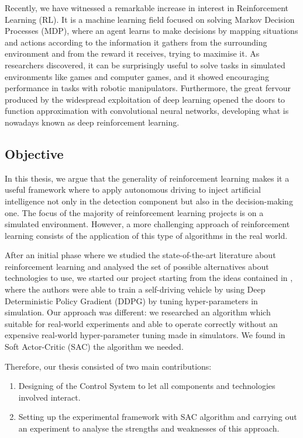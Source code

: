 \documentclass[10pt,twocolumn,letterpaper]{article}
\begin{document}
Recently, we have witnessed a remarkable increase in interest in Reinforcement Learning (RL). It is a machine learning field focused on solving Markov Decision Processes (MDP), where an agent learns to make decisions by mapping situations and actions according to the information it gathers from the surrounding environment and from the reward it receives, trying to maximise it.
As researchers discovered, it can be surprisingly useful to solve tasks in simulated environments like games and computer games, and it showed encouraging performance in tasks with robotic manipulators. Furthermore, the great fervour produced by the widespread exploitation of deep learning opened the doors to function approximation with convolutional neural networks, developing what is nowadays known as deep reinforcement learning.

\subsection{Objective}

In this thesis, we argue that the generality of reinforcement learning makes it a useful framework where to apply autonomous driving to inject artificial intelligence not only in the detection component but also in the decision-making one.
The focus of the majority of reinforcement learning projects is on a simulated environment. However, a more challenging approach of reinforcement learning consists of the application of this type of algorithms in the real world.

After an initial phase where we studied the state-of-the-art literature about reinforcement learning and analysed the set of possible alternatives about technologies to use, we started our project starting from the ideas contained in \cite{kendall2019learning}, where the authors were able to train a self-driving vehicle by using Deep Deterministic Policy Gradient (DDPG) \cite{lillicrap2015continuous} by tuning hyper-parameters in simulation.
Our approach was different: we researched an algorithm which suitable for real-world experiments and able to operate correctly without an expensive real-world hyper-parameter tuning made in simulators.
We found in Soft Actor-Critic (SAC) \cite{haarnoja2018soft} the algorithm we needed.

Therefore, our thesis consisted of two main contributions:
\begin{enumerate}
    \item Designing of the Control System to let all components and technologies involved interact.
    \item Setting up the experimental framework with SAC algorithm and carrying out an experiment to analyse the strengths and weaknesses of this approach.
\end{enumerate}
\end{document}
